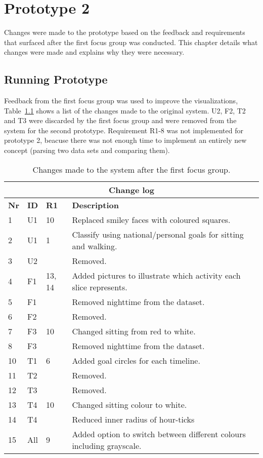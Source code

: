 \chapter{Prototype 2}
\label{ch:prototype2}
Changes were made to the prototype based on the feedback and requirements that surfaced after the first focus group was conducted. This chapter details what changes were made and explains why they were necessary.

\section{Running Prototype}
\label{sec:runningPrototype2}
Feedback from the first focus group was used to improve the visualizations, Table~\ref{fig:changeLog} shows a list of the changes made to the original system. U2, F2, T2 and T3 were discarded by the first focus group and were removed from the system for the second prototype. Requirement R1-8 was not implemented for prototype 2, beacuse there was not enough time to implement an entirely new concept (parsing two data sets and comparing them).

\begin{table}[h!]
  \centering
  \begin{tabular}{|l|l|l|p{8cm}|}
      \multicolumn{4}{c}{\textbf{Change log}} \\ \hline
      \textbf{Nr} & \textbf{ID} & \textbf{R1} & \textbf{Description} \\ \hline
      1  & U1  & 10       & Replaced smiley faces with coloured squares. \\ \hline
      2  & U1  & 1        & Classify using national/personal goals for sitting and walking.\\ \hline 
      3  & U2  &          & Removed. \\ \hline
      4  & F1  & 13, 14   & Added pictures to illustrate which activity each slice represents. \\ \hline
      5  & F1  &          & Removed nighttime from the dataset. \\ \hline
      6  & F2  &          & Removed. \\ \hline 
      7  & F3  & 10       & Changed sitting from red to white. \\ \hline
      8  & F3  &          & Removed nighttime from the dataset. \\ \hline
      10 & T1  & 6        & Added goal circles for each timeline. \\ \hline
      11 & T2  &          & Removed. \\ \hline
      12 & T3  &          & Removed. \\ \hline
      13 & T4  & 10       & Changed sitting colour to white. \\ \hline
      14 & T4  &          & Reduced inner radius of hour-ticks \\ \hline
      15 & All & 9        & Added option to switch between different colours including grayscale. \\ \hline
  \end{tabular}
  \caption[Changes made after the first focus group]{Changes made to the system after the first focus group.}
  \label{fig:changeLog}
\end{table}

